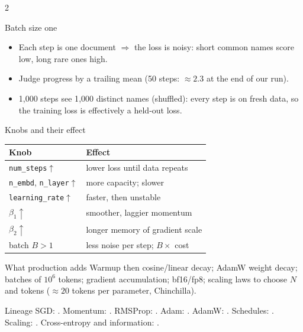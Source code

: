 \documentclass[10pt,letterpaper]{article}
\newcommand{\code}[1]{\lstinline[basicstyle=\ttfamily\small]|#1|}
\begin{document}
\begin{multicols}{2}
\columnbreak

\begin{csb}{Batch size one}
\begin{itemize}
  \item Each step is one document $\Rightarrow$ the loss is noisy: short common names score low, long rare ones high.
  \item Judge progress by a trailing mean (50 steps: $\approx 2.3$ at the end of our run).
  \item 1{,}000 steps see 1{,}000 distinct names (shuffled): every step is on fresh data, so the training loss is effectively a held-out loss.
\end{itemize}
\end{csb}

\begin{csb}{Knobs and their effect}
\begin{tabular}{@{}ll@{}}
\toprule
Knob & Effect \\
\midrule
\code{num_steps}$\uparrow$ & lower loss until data repeats \\
\code{n_embd}, \code{n_layer}$\uparrow$ & more capacity; slower \\
\code{learning_rate}$\uparrow$ & faster, then unstable \\
$\beta_1\uparrow$ & smoother, laggier momentum \\
$\beta_2\uparrow$ & longer memory of gradient scale \\
batch $B>1$ & less noise per step; $B\times$ cost \\
\bottomrule
\end{tabular}
\end{csb}

\begin{csb}{What production adds}
Warmup then cosine/linear decay; AdamW weight decay; batches of $10^6$ tokens; gradient accumulation; bf16/fp8; scaling laws to choose $N$ and tokens ($\approx 20$ tokens per parameter, Chinchilla).
\end{csb}

\begin{csb}{Lineage}
SGD: \textcite{robbins1951stochastic}. Momentum: \textcite{polyak1964momentum}. RMSProp: \textcite{tieleman2012rmsprop}. Adam: \textcite{kingma2015adam}. AdamW: \textcite{loshchilov2019adamw}. Schedules: \textcite{loshchilov2017sgdr}. Scaling: \textcite{kaplan2020scaling,hoffmann2022chinchilla}. Cross-entropy and information: \textcite{shannon1948mathematical,cover2006elements}.
\end{csb}
\end{multicols}
\end{document}
